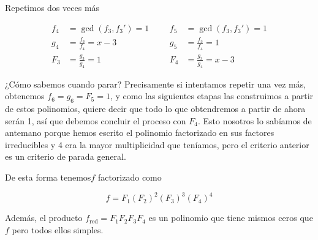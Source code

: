 \documentclass[../main.tex]{subfiles}
\begin{document}
Repetimos dos veces más

\begin{align*}
    f_4 &= \gcd(f_3, f_3') = 1 &&& f_5 &= \gcd(f_3, f_3') = 1\\
    g_4 &= \frac{f_3}{f_4} = x - 3&&&g_5 &= \frac{f_3}{f_4} = 1  \\
    F_3 &= \frac{g_3}{g_4} = 1&&&F_4 &= \frac{g_3}{g_4} = x-3
\end{align*}

¿Cómo sabemos cuando parar? Precisamente si intentamos repetir una vez más, obtenemos $f_6=g_6=F_5=1$, y como las siguientes etapas las construimos a partir de estos polinomios, quiere decir que todo lo que obtendremos a partir de ahora serán 1, así que debemos concluir el proceso con $F_4$. Esto nosotros lo sabíamos de antemano porque hemos escrito el polinomio factorizado en sus factores irreducibles y 4 era la mayor multiplicidad que teníamos, pero el criterio anterior es un criterio de parada general.

De esta forma tenemos$f$ factorizado como

\[ f= F_1(F_2)^2(F_3)^3(F_4)^4 \]

Además, el producto $f_{\operatorname{red}} = F_1F_2F_3F_4$ es un polinomio que tiene mismos ceros que $f$ pero todos ellos simples.
\end{document}
